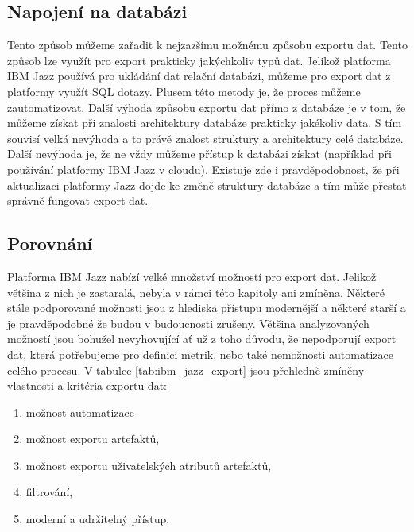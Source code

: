 \documentclass[czech,master]{diploma}
\begin{document}
\subsection{Napojení na databázi}
Tento způsob můžeme zařadit k nejzazšímu možnému způsobu exportu dat. Tento způsob lze využít pro export prakticky jakýchkoliv typů dat. Jelikož platforma IBM Jazz používá pro ukládání dat relační databázi, můžeme pro export dat z platformy využít SQL dotazy. Plusem této metody je, že proces můžeme zautomatizovat. Další výhoda způsobu exportu dat přímo z databáze je v tom, že můžeme získat při znalosti architektury databáze prakticky jakékoliv data. S tím souvisí velká nevýhoda a to právě znalost struktury a architektury celé databáze. Další nevýhoda je, že ne vždy můžeme přístup k databázi získat (například při používání platformy IBM Jazz v cloudu). Existuje zde i pravděpodobnost, že při aktualizaci platformy Jazz dojde ke změně struktury databáze a tím může přestat správně fungovat export dat.

\subsection{Porovnání}
Platforma IBM Jazz nabízí velké množství možností pro export dat. Jelikož většina z nich je zastaralá, nebyla v rámci této kapitoly ani zmíněna. Některé stále podporované možnosti jsou z hlediska přístupu modernější a některé starší a je pravděpodobné že budou v budoucnosti zrušeny. Většina analyzovaných možností jsou bohužel nevyhovující ať už z toho důvodu, že nepodporují export dat, která potřebujeme pro definici metrik, nebo také nemožnosti automatizace celého procesu. V tabulce \ref{tab:ibm_jazz_export} jsou přehledně zmíněny vlastnosti a kritéria exportu dat:

\begin{enumerate}
\item možnost automatizace
\item možnost exportu artefaktů,
\item možnost exportu uživatelských atributů artefaktů,
\item filtrování,
\item moderní a udržitelný přístup.
\end{enumerate}
\end{document}
